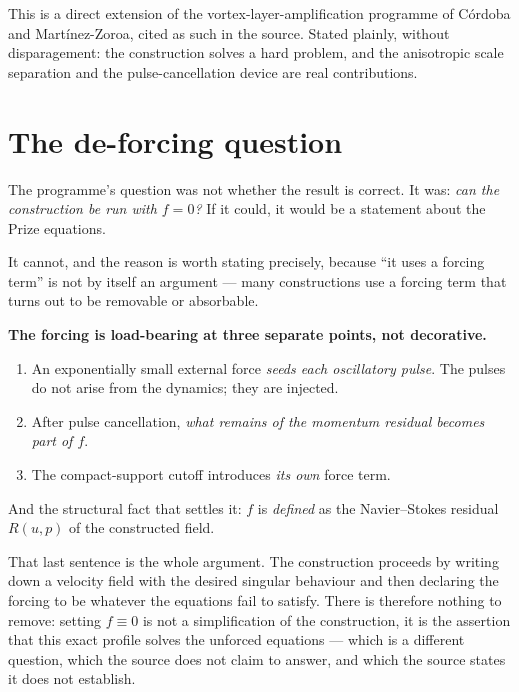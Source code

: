 This is a direct extension of the vortex-layer-amplification programme of
C\'ordoba and Mart\'inez-Zoroa, cited as such in the source. Stated plainly,
without disparagement: the construction solves a hard problem, and the
anisotropic scale separation and the pulse-cancellation device are real
contributions.

\section{The de-forcing question}
\label{sec:de-forcing}

The programme's question was not whether the result is correct. It was:
\emph{can the construction be run with \(f=0\)?} If it could, it would be a
statement about the Prize equations.

It cannot, and the reason is worth stating precisely, because ``it uses a
forcing term'' is not by itself an argument --- many constructions use a
forcing term that turns out to be removable or absorbable.

\begin{record}
\textbf{The forcing is load-bearing at three separate points, not
decorative.}
\begin{enumerate}[label=(\alph*), leftmargin=2.2em]
\item An exponentially small external force \emph{seeds each oscillatory
  pulse}. The pulses do not arise from the dynamics; they are injected.
\item After pulse cancellation, \emph{what remains of the momentum residual
  becomes part of \(f\)}.
\item The compact-support cutoff introduces \emph{its own} force term.
\end{enumerate}

\smallskip
And the structural fact that settles it: \(f\) is \emph{defined} as the
Navier--Stokes residual \(R(u,p)\) of the constructed field.
\end{record}

That last sentence is the whole argument. The construction proceeds by writing
down a velocity field with the desired singular behaviour and then declaring
the forcing to be whatever the equations fail to satisfy. There is therefore
nothing to remove: setting \(f\equiv0\) is not a simplification of the
construction, it is the assertion that this exact profile solves the unforced
equations --- which is a different question, which the source does not claim to
answer, and which the source states it does not establish.

